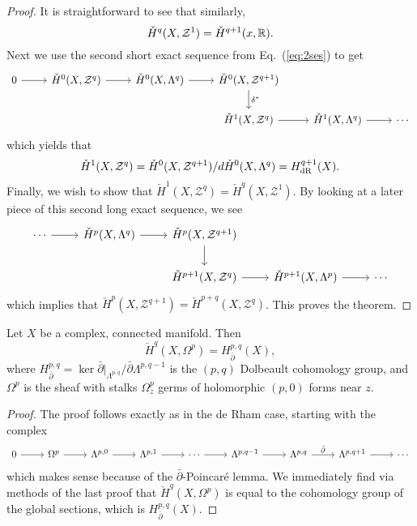 \documentclass{../mathnotes}
\begin{document}
\begin{proof}
    It is straightforward to see that similarly,
    \[\check H^q(X,\mathcal{Z}^1)=\check H^{q+1}(x,\mathbb{R}).\]
    Next we use the second short exact sequence from Eq.~(\ref{eq:2ses}) to get
    \begin{equation*}
        \begin{tikzcd}
            0\arrow{r}&\check H^0(X,\mathcal{Z}^q)\arrow{r}&\check H^0(X,\Lambda^q)\arrow{r}&\check H^0(X,\mathcal{Z}^{q+1})\arrow{d}{\delta^*}\\
            &&&\check H^1(X,\mathcal{Z}^q)\arrow{r}&\check H^1(X,\Lambda^q)\arrow{r}&\cdots
        \end{tikzcd}
    \end{equation*}
    which yields that
    \[\check H^1(X,\mathcal{Z}^q)=\check H^0(X,\mathcal{Z}^{q+1})/d\check H^0(X,\Lambda^q)=H^{q+1}_{\rm dR}(X).\]
    Finally, we wish to show that $\check H^1(X,\mathcal{Z}^q)=\check H^q(X,\mathcal{Z}^1)$.
    By looking at a later piece of this second long exact sequence, we see
    \begin{equation*}
        \begin{tikzcd}
            \cdots\arrow{r}&\check H^p(X,\Lambda^q)\arrow{r}&\check H^p(X,\mathcal{Z}^{q+1})\arrow{d}\\
            &&\check H^{p+1}(X,\mathcal{Z}^q)\arrow{r}&\check H^{p+1}(X,\Lambda^p)\arrow{r}&\cdots
        \end{tikzcd}
    \end{equation*}
    which implies that $\check H^p(X,\mathcal{Z}^{q+1})=\check H^{p+q}(X,\mathcal{Z}^q)$. This proves the theorem.
\end{proof}

\begin{thm}[Dolbeault]
    Let $X$ be a complex, connected manifold. Then
    \[\check H^q(X,\Omega^p)=H_{\bar\partial}^{p,q}(X),\]
    where $H_{\bar\partial}^{p,q}=\ker \bar\partial|_{\Lambda^{p,q}}/\bar\partial\Lambda^{p,q-1}$ is the 
    $(p,q)$ Dolbeault cohomology group, and $\Omega^p$ is the sheaf with stalks $\Omega^p_z$ germs of holomorphic
    $(p,0)$ forms near $z$.
\end{thm}
\begin{proof}
    The proof follows exactly as in the de Rham case, starting with the complex
    \begin{equation*}
        \begin{tikzcd}
            0\arrow{r}&\Omega^p\arrow{r}&\Lambda^{p,0}\arrow{r}&\Lambda^{p,1}\arrow{r}&\cdots\arrow{r}&\Lambda^{p,q-1}\arrow{r}&\Lambda^{p,q}\arrow{r}{\bar\partial}&\Lambda^{p,q+1}\arrow{r}&\cdots
        \end{tikzcd}
    \end{equation*}
    which makes sense because of the $\bar\partial$-Poincar\'e lemma. We immediately find via methods of the last proof
    that $\check H^q(X,\Omega^p)$ is equal to the cohomology group
    of the global sections, which is $H^{p,q}_{\bar\partial}(X)$.
\end{proof}
\end{document}
